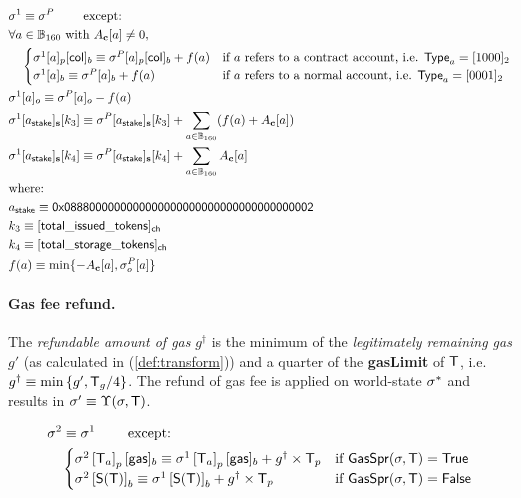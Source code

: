 \begin{align}
	&\st^1  \eqdef \st^{P} \qquad \mbox{  except:}\\
	&\forall a \in \B_{160} \text{ with }  A_{\bf c}[a]\neq 0, \\
	&\quad \begin{cases}
	\st^1[a]_p[{\sf col}]_b \eqdef \st^{P}[a]_p[{\sf col}]_b + f(a) & \mbox{if $a$ refers to a contract account, i.e. $\mathsf{Type}_{a}=\typecontract$} \\
	\st^1[a]_b \eqdef \st^{P}[a]_b + f(a) & \mbox{if $a$ refers to a normal account, i.e. $\mathsf{Type}_{a}= \typenormal$}
	\end{cases}\\
	& \st^1[a]_o \eqdef \st^P[a]_o - f(a)\\ 
	&\st^1[a_{\sf stake}]_{\bf s}[k_3] \eqdef \st^P[a_{\sf stake}]_{\bf s}[k_3] + \sum_{a\in \B_{160}}(f(a) + A_{\bf c}[a]) \\
	&\st^1[a_{\sf stake}]_{\bf s}[k_4] \eqdef \st^P[a_{\sf stake}]_{\bf s}[k_4] + \sum_{a\in \B_{160}}A_{\bf c}[a] \\
	&\mbox{where:}  \\
	&a_{\sf stake} \eqdef \stakingcontract \\ 
	&k_3 \eqdef {\sf [total\char`_issued\char`_tokens]_{\sf ch}}  \\ 
	&k_4 \eqdef {\sf [total\char`_storage\char`_tokens]_{\sf ch}}  \\ 
	& f(a) \eqdef \min\{-A_{\bf c}[a], \st^P_o[a]\}
\end{align}


\paragraph{Gas fee refund.}

The \emph{refundable amount of gas} $g^{\dagger}$ is the minimum of the \emph{legitimately remaining gas} $g'$ (as calculated in (\ref{def:transform})) and a quarter of the \textbf{gasLimit} of $\textsf{T}$,
	i.e. $g^{\dagger}\equiv \min{\left \{{g', \textsf{T}_g/4} \right \}}$.
The refund of gas fee is applied on world-state $\mathbf{\sigma}^{*}$ and results in $\mathbf{\sigma}'\equiv \Upsilon(\mathbf{\sigma},\textsf{T})$.

\begin{align}
	& \mathbf{\sigma}^2  \equiv \mathbf{\sigma}^1 \qquad \mbox{  except:}\\
	& \quad \begin{cases} 
		\mathbf{\sigma}^2\left[\textsf{T}_a\right]_p[{\sf gas}]_b \equiv \mathbf{\sigma}^1\left[\textsf{T}_a\right]_p[{\sf gas}]_b+g^{\dagger}\times \textsf{T}_p 
		& \mbox{if $\mathsf{GasSpr}(\mathbf{\sigma},\textsf{T})=\mathsf{True}$}\\
		\mathbf{\sigma}^2 \left[\mathsf{S}{\left({\textsf{T}} \right)}\right]_b \equiv \mathbf{\sigma}^1\left[\mathsf{S}{\left({\textsf{T}} \right)}\right]_b + g^{\dagger}\times \textsf{T}_p 
		& \mbox{if $\mathsf{GasSpr}(\mathbf{\sigma},\textsf{T})=\mathsf{False}$}
	\end{cases} 
\end{align}

